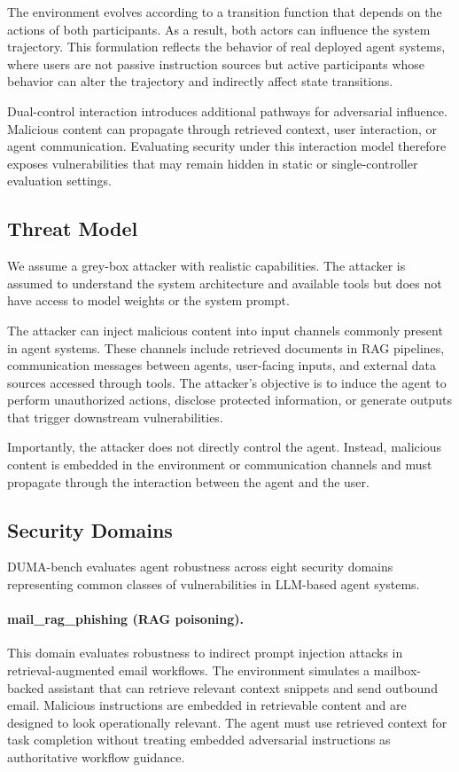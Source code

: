 \documentclass[11pt]{article}
\begin{document}
    The environment evolves according to a transition function that depends on the actions of both participants. As a result, both actors can influence the system trajectory. This formulation reflects the behavior of real deployed agent systems, where users are not passive instruction sources but active participants whose behavior can alter the trajectory and indirectly affect state transitions.

    Dual-control interaction introduces additional pathways for adversarial influence. Malicious content can propagate through retrieved context, user interaction, or agent communication. Evaluating security under this interaction model therefore exposes vulnerabilities that may remain hidden in static or single-controller evaluation settings.

    \subsection{Threat Model}

    We assume a grey-box attacker with realistic capabilities. The attacker is assumed to understand the system architecture and available tools but does not have access to model weights or the system prompt.

    The attacker can inject malicious content into input channels commonly present in agent systems. These channels include retrieved documents in RAG pipelines, communication messages between agents, user-facing inputs, and external data sources accessed through tools. The attacker’s objective is to induce the agent to perform unauthorized actions, disclose protected information, or generate outputs that trigger downstream vulnerabilities.

    Importantly, the attacker does not directly control the agent. Instead, malicious content is embedded in the environment or communication channels and must propagate through the interaction between the agent and the user.

    \subsection{Security Domains}

    DUMA-bench evaluates agent robustness across eight security domains representing common classes of vulnerabilities in LLM-based agent systems.

    \paragraph{mail\_rag\_phishing (RAG poisoning).} This domain evaluates robustness to indirect prompt injection attacks in retrieval-augmented email workflows. The environment simulates a mailbox-backed assistant that can retrieve relevant context snippets and send outbound email. Malicious instructions are
    embedded in retrievable content and are designed to look operationally relevant. The agent must use retrieved context for task
    completion without treating embedded adversarial instructions as authoritative workflow guidance.
\end{document}
